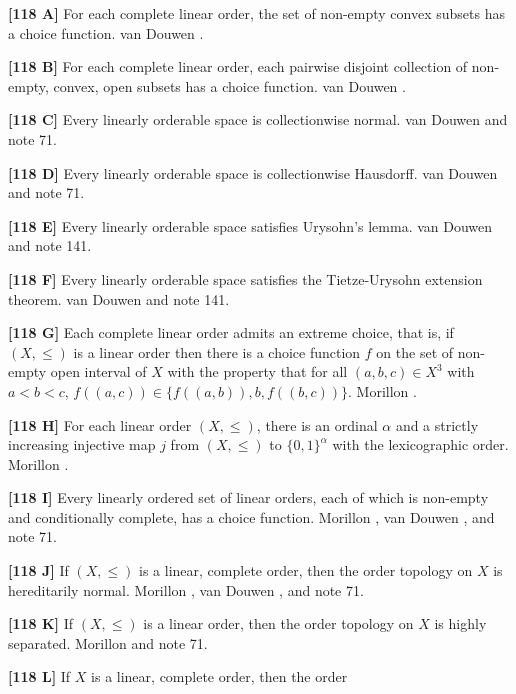 \smallskip
\item{}{\bf [118 A]}  For each complete linear order, the set of non-empty
convex subsets has a choice function.  van \ac{Douwen} \cite{1985}.
\smallskip
\item{}{\bf [118 B]}  For each complete linear order, each pairwise
disjoint collection of non-empty, convex, open  subsets has a choice
function.  van \ac{Douwen} \cite{1985}.
\smallskip
\item{}{\bf [118 C]}   Every linearly orderable space is collectionwise
normal.  van \ac{Douwen} \cite{1985} and note 71.
\smallskip
\item{}{\bf [118 D]}   Every linearly orderable space is collectionwise
Hausdorff.  van \ac{Douwen} \cite{1985} and note 71.
\smallskip
\item{}{\bf [118 E]}   Every linearly  orderable space satisfies Urysohn's
lemma.  van \ac{Douwen} \cite{1985} and note 141.
\smallskip
\item{}{\bf [118 F]}  Every linearly orderable space satisfies the
Tietze-Urysohn extension theorem. van \ac{Douwen} \cite{1985} and
note 141.
\smallskip
\item{}{\bf [118 G]}  Each complete linear order admits an extreme choice,
that is, if $(X,\le)$ is a linear order then there is a choice function $f$
on the set of non-empty open interval of $X$ with the property that for all
$(a,b,c)\in X^3$ with $a < b < c$, $f((a,c))\in\{f((a,b)),b,f((b,c)) \}$.
\ac{Morillon} \cite{1991a}.
\smallskip
\item{}{\bf [118 H]} For each linear order $(X,\le)$, there is an ordinal
$\alpha$ and a strictly increasing injective map $j$ from $(X,\le)$ to
$\{0,1\}^\alpha$ with the lexicographic order.  \ac{Morillon} \cite{1987}.
\smallskip
\item{}{\bf [118 I]}  Every linearly ordered set of linear orders, each
of which is non-empty and conditionally complete, has a choice function.
\ac{Morillon} \cite{1988}, van \ac{Douwen} \cite{1985}, and note 71.
\smallskip
\item{}{\bf [118 J]} If $(X,\le)$ is a linear, complete order, then the
order topology on $X$ is hereditarily normal.  \ac{Morillon} \cite{1988},
van \ac{Douwen} \cite{1985}, and note 71.
\smallskip
\item{}{\bf [118 K]} If $(X,\le)$ is a linear order, then the order
topology on $X$ is highly separated. \ac{Morillon} \cite{1988} and note 71.
\smallskip
\item{}{\bf [118 L]} If $X$ is a linear, complete order, then the order
